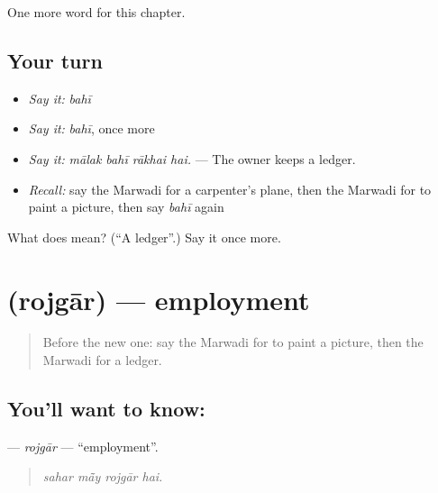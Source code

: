 \begin{grammarlens}[title={What you've built}]
One more word for this chapter.
\end{grammarlens}

\subsection*{Your turn}
\begin{itemize}
\raggedright
  \item \emph{Say it:} \emph{bahī}
  \item \emph{Say it:} \emph{bahī}, once more
  \item \emph{Say it:} \emph{mālak bahī rākhai hai.} — The owner keeps a ledger.
  \item \emph{Recall:} say the Marwadi for a carpenter's plane, then the Marwadi for to paint a picture, then say \emph{bahī} again
\end{itemize}

\begin{tcolorbox}[breakable,colback=teal!4,colframe=teal!35!black,title={Before you move on}]
What does  mean? (\textquotedblleft{}A ledger\textquotedblright{}.) Say it once more.
\end{tcolorbox}
\section[\texorpdfstring{\mw{रोजगार} (rojgār)}{रोजगार (rojgār)}]{ (rojgār) — employment}

\label{lesson:MW-C290-rojgar}



\begin{quote}
Before the new one: say the Marwadi for to paint a picture, then the Marwadi for a ledger.
\end{quote}

\subsection*{You'll want to know: }
\textbf{} — \emph{rojgār} — \textquotedblleft{}employment\textquotedblright{}.

\begin{quote}
   
\end{quote}

\begin{quote}
\emph{sahar mā̃y rojgār hai.}
\end{quote}

